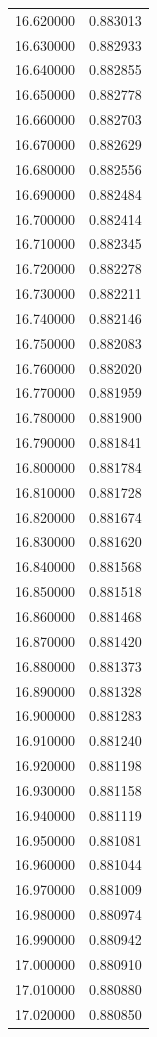 \begin{tabular}{rr}
16.620000 & 0.883013 \\
16.630000 & 0.882933 \\
16.640000 & 0.882855 \\
16.650000 & 0.882778 \\
16.660000 & 0.882703 \\
16.670000 & 0.882629 \\
16.680000 & 0.882556 \\
16.690000 & 0.882484 \\
16.700000 & 0.882414 \\
16.710000 & 0.882345 \\
16.720000 & 0.882278 \\
16.730000 & 0.882211 \\
16.740000 & 0.882146 \\
16.750000 & 0.882083 \\
16.760000 & 0.882020 \\
16.770000 & 0.881959 \\
16.780000 & 0.881900 \\
16.790000 & 0.881841 \\
16.800000 & 0.881784 \\
16.810000 & 0.881728 \\
16.820000 & 0.881674 \\
16.830000 & 0.881620 \\
16.840000 & 0.881568 \\
16.850000 & 0.881518 \\
16.860000 & 0.881468 \\
16.870000 & 0.881420 \\
16.880000 & 0.881373 \\
16.890000 & 0.881328 \\
16.900000 & 0.881283 \\
16.910000 & 0.881240 \\
16.920000 & 0.881198 \\
16.930000 & 0.881158 \\
16.940000 & 0.881119 \\
16.950000 & 0.881081 \\
16.960000 & 0.881044 \\
16.970000 & 0.881009 \\
16.980000 & 0.880974 \\
16.990000 & 0.880942 \\
17.000000 & 0.880910 \\
17.010000 & 0.880880 \\
17.020000 & 0.880850 \\

\end{tabular}
